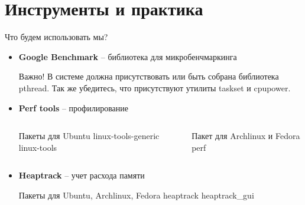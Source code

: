 \section{Инструменты и практика}

\begin{frame}{Что будем использовать мы?}
	\begin{itemize}
		\item \textbf{Google Benchmark} -- библиотека для микробенчмаркинга \href{https://github.com/google/benchmark}{}
		\begin{block}{Важно!}
			В системе должна присутствовать или быть собрана библиотека pthread. Так же убедитесь, что присутствуют утилиты taskset и cpupower.
		\end{block}
		\item \textbf{Perf tools} -- профилирование 
		\begin{columns}
			\begin{column}{.4\textwidth}
				\begin{block}{Пакеты для Ubuntu}
					linux-tools-generic linux-tools
				\end{block}
			\end{column}
			\begin{column}{.5\textwidth}
				\begin{block}{Пакет для Archlinux и Fedora}
					perf
				\end{block}
			\end{column}
		\end{columns}
		\item \textbf{Heaptrack} -- учет расхода памяти
		\begin{block}{Пакеты для Ubuntu, Archlinux, Fedora}
			heaptrack heaptrack\_gui
		\end{block}
	\end{itemize}

\end{frame}